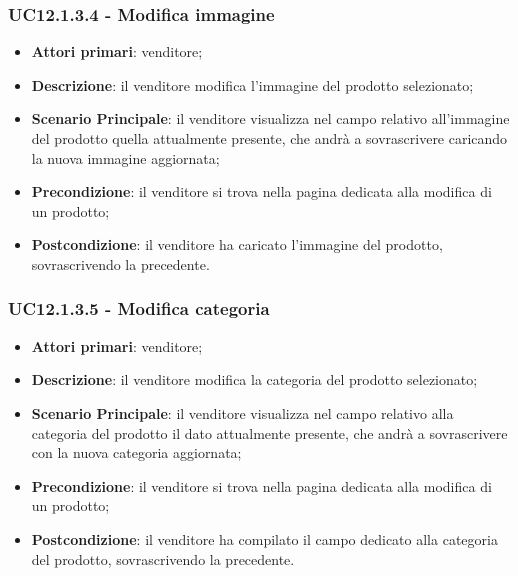 \subsubsection{UC12.1.3.4 - Modifica immagine}
\begin{itemize}
\item \textbf{Attori primari}: venditore;
\item \textbf{Descrizione}: il venditore modifica l'immagine del prodotto selezionato;
\item \textbf{Scenario Principale}: il venditore visualizza nel campo relativo all'immagine del prodotto quella attualmente presente, che andrà a sovrascrivere caricando la nuova immagine aggiornata;
\item \textbf{Precondizione}: il venditore si trova nella pagina dedicata alla modifica di un prodotto;
\item \textbf{Postcondizione}: il venditore ha caricato l'immagine del prodotto, sovrascrivendo la precedente.
\end{itemize}

\subsubsection{UC12.1.3.5 - Modifica categoria}
\begin{itemize}
\item \textbf{Attori primari}: venditore;
\item \textbf{Descrizione}: il venditore modifica la categoria del prodotto selezionato;
\item \textbf{Scenario Principale}: il venditore visualizza nel campo relativo alla categoria del prodotto il dato attualmente presente, che andrà a sovrascrivere con la nuova categoria aggiornata;
\item \textbf{Precondizione}: il venditore si trova nella pagina dedicata alla modifica di un prodotto;
\item \textbf{Postcondizione}: il venditore ha compilato il campo dedicato alla categoria del prodotto, sovrascrivendo la precedente.
\end{itemize}

